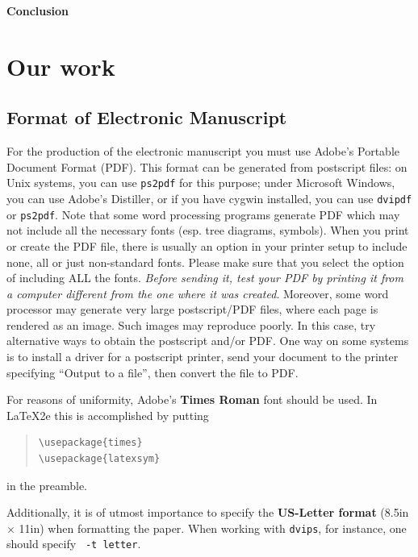 \documentclass[11pt,letterpaper]{article}
\begin{document}
{\bf Conclusion} \\

\section{Our work}







\subsection{Format of Electronic Manuscript}
\label{sect:pdf}

For the production of the electronic manuscript you must use Adobe's
Portable Document Format (PDF). This format can be generated from
postscript files: on Unix systems, you can use {\tt ps2pdf} for this
purpose; under Microsoft Windows, you can use Adobe's Distiller, or
if you have cygwin installed, you can use {\tt dvipdf} or
{\tt ps2pdf}.  Note 
that some word processing programs generate PDF which may not include
all the necessary fonts (esp. tree diagrams, symbols). When you print
or create the PDF file, there is usually an option in your printer
setup to include none, all or just non-standard fonts.  Please make
sure that you select the option of including ALL the fonts.  {\em
  Before sending it, test your {\/\em PDF} by printing it from a
  computer different from the one where it was created}. Moreover,
some word processor may generate very large postscript/PDF files,
where each page is rendered as an image. Such images may reproduce
poorly.  In this case, try alternative ways to obtain the postscript
and/or PDF.  One way on some systems is to install a driver for a
postscript printer, send your document to the printer specifying
``Output to a file'', then convert the file to PDF.

For reasons of uniformity, Adobe's {\bf Times Roman} font should be
used. In \LaTeX2e{} this is accomplished by putting

\begin{quote}
\begin{verbatim}
\usepackage{times}
\usepackage{latexsym}
\end{verbatim}
\end{quote}
in the preamble.

Additionally, it is of utmost importance to specify the {\bf
  US-Letter format} (8.5in $\times$ 11in) when formatting the paper.
When working with {\tt dvips}, for instance, one should specify {\tt
  -t letter}.
\end{document}
